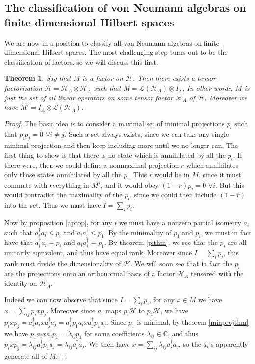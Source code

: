 \documentclass[12pt]{article}
\newcommand{\Ll}{\mathcal{L}}
\newcommand{\Hh}{\mathcal{H}}
\newcommand{\HA}{\mathcal{H}_A}
\newcommand{\HAb}{\mathcal{H}_{\ol{A}}}
\newcommand{\ol}{\overline}
\newtheorem{thm}{Theorem}[section]
\begin{document}
\subsection{The classification of von Neumann algebras on finite-dimensional Hilbert spaces}
We are now in a position to classify all von Neumann algebras on finite-dimensional Hilbert spaces.  The most challenging step turns out to be the classification of factors, so we will discuss this first.  
\begin{thm}\label{factorthm}
Say that $M$ is a factor on $\Hh$.  Then there exists a tensor factorization $\Hh=\HA\otimes\HAb$ such that $M=\Ll(\HA)\otimes I_{\ol{A}}$.  In other words, $M$ is just the set of all linear operators on some tensor factor $\HA$ of $\Hh$.  Moreover we have $M'=I_A\otimes \Ll(\HAb)$.  
\end{thm}
\begin{proof}
The basic idea is to consider a maximal set of minimal projections $p_i$ such that $p_ip_j=0\,\, \forall i\neq j$.  Such a set always exists, since we can take any single minimal projection and then keep including more until we no longer can.  The first thing to show is that there is no state which is annihilated by all the $p_i$.  If there were, then we could define a nonmaximal projection $r$ which annihilates only those states annihilated by all the $p_i$.  This $r$ would be in $M$, since it must commute with everything in $M'$, and it would obey $(1-r)p_i=0 \,\,\forall i$.  But this would contradict the maximality of the $p_i$, since we could then include $(1-r)$ into the set.  Thus we must have $I=\sum_i p_i$.  

Now by proposition \eqref{aprop}, for any $i$ we must have a nonzero partial isometry $a_i$ such that $a_i^\dagger a_i \leq p_i$ and $a_i a_i^\dagger \leq p_1$.  By the minimality of $p_1$ and $p_i$, we must in fact have that $a_i^\dagger a_i=p_i$ and $a_i a^\dagger_i=p_1$.  By theorem \eqref{pithm}, we see that the $p_i$ are all unitarily equivalent, and thus have equal rank.  Moreover since $I=\sum_i p_i$, this rank must divide the dimensionality of $\Hh$.  We will soon see that in fact the $p_i$ are the projections onto an orthonormal basis of a factor $\HA$ tensored with the identity on $\HAb$.      

Indeed we can now observe that since $I=\sum_i p_i$, for any $x\in M$ we have $x=\sum_{ij}p_ixp_j$.  Moreover since $a_i$ maps $p_i\Hh$ to $p_1\Hh$, we have $p_i x p_j=a_i^\dagger a_i x a_j^\dagger a_j=a_i^\dagger p_1a_i x a_j^\dagger p_1 a_j$.   Since $p_1$ is minimal, by theorem \eqref{minprojthm} we have $p_1a_i x a_j^\dagger p_1=\lambda_{ij} p_1$ for some coefficients $\lambda_{ij}\in \mathbb{C}$, and thus $p_i x p_j=\lambda_{ij} a_i^\dagger p_1 a_j=\lambda_{ij} a_i^\dagger a_j$.  We then have $x=\sum_{ij}\lambda_{ij}a^\dagger_i a_j$, so the $a_i$'s apparently generate all of $M$.


\end{proof}
\end{document}
